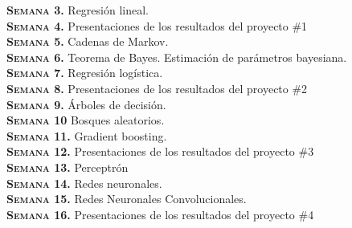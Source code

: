 \documentclass[letterpaper,10pt,onecolumn]{article}
\begin{document}
\noindent\textbf{\textsc{Semana 3.}}
Regresión lineal.
\\[-0.3cm]

\noindent\textbf{\textsc{Semana 4.}} 
Presentaciones de los resultados  del proyecto \#1
\\[-0.3cm] %

\noindent\textbf{\textsc{Semana 5.}}
Cadenas de Markov.
\\[-0.3cm] %

\noindent\textbf{\textsc{Semana 6.}}
Teorema de Bayes. Estimación de parámetros bayesiana.
\\[-0.3cm] %

\noindent\textbf{\textsc{Semana 7.}}
Regresión logística.
\\[-0.3cm] %

\noindent\textbf{\textsc{Semana 8.}}
Presentaciones de los resultados  del proyecto \#2
\\[-0.3cm] %

\noindent\textbf{\textsc{Semana 9.}}
Árboles de decisión.
\\[-0.3cm] %

\noindent\textbf{\textsc{Semana 10}}
Bosques aleatorios.
\\[-0.3cm] %

\noindent\textbf{\textsc{Semana 11.}}
Gradient boosting.
\\[-0.3cm]

\noindent\textbf{\textsc{Semana 12.}}
Presentaciones de los resultados  del proyecto \#3
\\[-0.3cm]

\noindent\textbf{\textsc{Semana 13.}}
Perceptrón
\\[-0.3cm]

\noindent\textbf{\textsc{Semana 14.}}
Redes neuronales.
\\[-0.3cm]

\noindent\textbf{\textsc{Semana 15.}}
Redes Neuronales Convolucionales.
\\[-0.3cm]

\noindent\textbf{\textsc{Semana 16.}}
Presentaciones de los resultados del proyecto \#4
\\[0.1cm]
\end{document}
